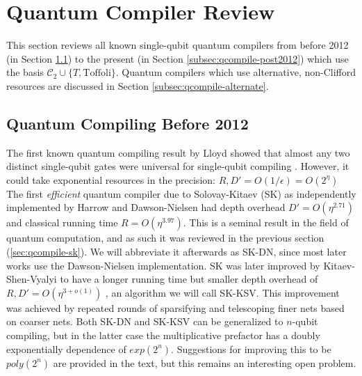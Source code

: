 \section{Quantum Compiler Review}
\label{sec:qcompile-review}

This section reviews all known single-qubit quantum compilers from
before 2012 (in Section \ref{subsec:qcompile-pre2012}) to the
present (in Section \ref{subsec:qcompile-post2012}) which use
the basis $\mathcal{C}_2 \cup \{T, \text{Toffoli} \}$.
Quantum compilers which use alternative, non-Clifford resources
are discussed in Section \ref{subsec:qcompile-alternate}.

\subsection{Quantum Compiling Before 2012}
\label{subsec:qcompile-pre2012}

The first known quantum compiling result by Lloyd showed that almost any two
distinct single-qubit gates were universal for single-qubit compiling
\cite{Lloyd1995}. However, it could take exponential resources in the precision:
$R,D' = O(1/\epsilon) = O(2^{\eta})$
The first \emph{efficient} quantum compiler due to
Solovay-Kitaev (SK) as independently implemented by Harrow \cite{Harrow2001}
and Dawson-Nielsen \cite{Dawson2005} had depth overhead
$D' = O(\eta^{2.71})$ and classical running time
$R = O(\eta^{3.97})$. This is a seminal result in
the field of quantum computation, and as such it was reviewed in the previous
section (\ref{sec:qcompile-sk}). We will abbreviate it afterwards as SK-DN,
since most later works use the Dawson-Nielsen implementation.
SK was later improved by Kitaev-Shen-Vyalyi
to have a longer running time but smaller depth overhead of
$R,D' = O(\eta^{3+o(1)})$
\cite{Kitaev2002}, an algorithm we will call SK-KSV.
This improvement was achieved by repeated rounds of sparsifying and
telescoping finer nets based on coarser nets. Both SK-DN and SK-KSV can be
generalized to $n$-qubit compiling, but in the latter case the multiplicative
prefactor has a doubly exponentially dependence of $exp(2^{n})$. Suggestions
for improving this to be $poly(2^n)$ are provided in the text, but this remains
an interesting open problem.

